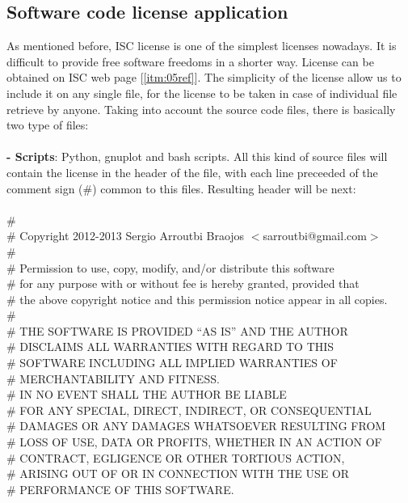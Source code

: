 \documentclass[11pt]{article}
\begin{document}
\subsection{Software code license application}
As mentioned before, ISC license is one of the simplest licenses nowadays. It is difficult to provide free software freedoms in a shorter way.
License can be obtained on ISC web page [\ref{itm:05ref}]. The simplicity of the license allow us to include it on any single file, for the license to be taken in case of individual file retrieve by anyone. Taking into account the source code files, there is basically two type of files:\\
\\
\textbf{- Scripts}: Python, gnuplot and bash scripts. All this kind of source files will contain the license in the header of the file, with each line preceeded of the comment sign (\#) common to this files. Resulting header will be next:\\
\\
\#\\
\# Copyright 2012-2013 Sergio Arroutbi Braojos $<$sarroutbi@gmail.com$>$\\
\# \\
\# Permission to use, copy, modify, and/or distribute this software \\
\# for any purpose with or without fee is hereby granted, provided that \\
\# the above copyright notice and this permission notice appear in all copies.\\
\# \\
\# THE SOFTWARE IS PROVIDED “AS IS” AND THE AUTHOR \\
\# DISCLAIMS ALL WARRANTIES  WITH REGARD TO THIS \\
\# SOFTWARE INCLUDING ALL IMPLIED WARRANTIES OF \\
\# MERCHANTABILITY AND FITNESS. \\
\# IN NO EVENT SHALL THE AUTHOR BE LIABLE \\
\# FOR ANY SPECIAL, DIRECT, INDIRECT, OR CONSEQUENTIAL \\
\# DAMAGES OR ANY DAMAGES WHATSOEVER RESULTING FROM \\
\# LOSS OF USE, DATA OR PROFITS, WHETHER IN AN ACTION OF \\  
\# CONTRACT, EGLIGENCE OR OTHER TORTIOUS ACTION, \\ 
\# ARISING OUT OF OR IN CONNECTION WITH THE USE OR \\
\# PERFORMANCE OF THIS SOFTWARE.\\
\end{document}
